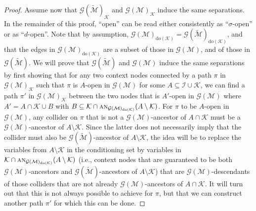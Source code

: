\documentclass[twoside,11pt]{article}
\newcommand\C[1]{\mathcal{#1}}
\newcommand\mathbfsc[1]{\text{\normalfont\scshape#1}}
\newcommand\ansub[2]{\mathbfsc{an}_{#1}(#2)}
\newcommand{\intervene}{\mathrm{do}}
\begin{document}
\begin{proof}
Assume now that $\C{G}(\tilde{\C{M}})_{\C{K}}$ and $\C{G}(\C{M})_{\C{K}}$ induce the same separations.
In the remainder of this proof, ``open'' can be read either consistently as ``$\sigma$-open'' or as ``$d$-open''.
Note that by assumption, $\C{G}(\C{M})_{\intervene(\C{K})}
= \C{G}(\tilde{\C{M}})_{\intervene(\C{K})}$, and that the edges in $\C{G}(\C{M})_{\intervene(\C{K})}$
are a subset of those in $\C{G}(\C{M})$, and of those in $\C{G}(\tilde{\C{M}})$.
We will prove that $\C{G}(\tilde{\C{M}})$ and $\C{G}(\C{M})$ induce the same separations by first
showing that for any two context nodes connected by a path $\pi$ in $\C{G}(\C{M})_{\C{K}}$ such that $\pi$ is 
$A$-open in $\C{G}(\C{M})$ for some $A \subseteq \C{I} \cup \C{K}$, we can find a path $\pi'$
in $\C{G}(\C{M})_{\C{K}}$ between the two nodes that is $A'$-open in $\C{G}(\C{M})$ where
$A' = A \cap \C{K} \cup B$ with $B \subseteq \C{K} \cap \ansub{\C{G}(\C{M})_{\intervene(\C{K})}}{A \setminus \C{K}}$. 
For $\pi$ to be $A$-open in $\C{G}(\C{M})$, any collider on $\pi$ that is not a $\C{G}(\C{M})$-ancestor of $A \cap \C{K}$ must
be a $\C{G}(\C{M})$-ancestor of $A \setminus \C{K}$. Since the latter does not necessarily imply that the collider must also be 
$\C{G}(\tilde{\C{M}})$-ancestor of $A \setminus \C{K}$, the idea will be to replace the variables from $A \setminus \C{K}$ in the conditioning set by variables in $\C{K} \cap \ansub{\C{G}(\C{M})_{\intervene(\C{K})}}{A \setminus \C{K}}$
(i.e., context nodes that are guaranteed to be both $\C{G}(\C{M})$-ancestors and $\C{G}(\tilde{\C{M}})$-ancestors of $A \setminus \C{K}$)
that are $\C{G}(\C{M})$-descendants of those colliders that are not already $\C{G}(\C{M})$-ancestors of $A \cap \C{K}$.
It will turn out that this is not always possible to achieve for $\pi$, but that we can construct another path $\pi'$
for which this can be done. 


\end{proof}
\end{document}
